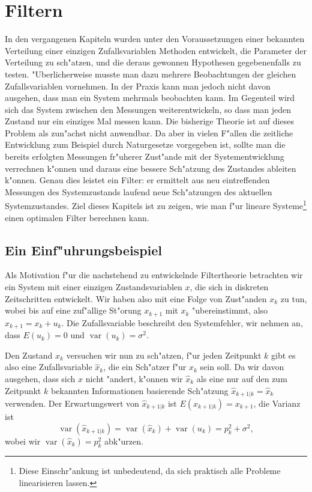 %
%
%
\chapter{Filtern} \label{chapter-filtern}

In den vergangenen Kapiteln wurden unter den Voraussetzungen einer
bekannten Verteilung einer einzigen Zufallsvariablen Methoden entwickelt,
die Parameter der Verteilung zu sch"atzen, und die deraus gewonnen
Hypothesen gegebenenfalls zu testen.
"Uberlicherweise musste man dazu
mehrere Beobachtungen der gleichen Zufallsvariablen vornehmen.
In der Praxis kann man jedoch
nicht davon ausgehen, dass man ein System mehrmals beobachten kann.
Im Gegenteil wird sich das System zwischen den Messungen weiterentwickeln,
so dass man jeden Zustand nur ein einziges Mal messen kann.
Die bisherige
Theorie ist auf dieses Problem als zun"achst nicht anwendbar.
Da aber in vielen F"allen die zeitliche Entwicklung zum Beispiel durch
Naturgesetze vorgegeben ist, sollte man die bereits erfolgten Messungen
fr"uherer Zust"ande mit der Systementwicklung verrechnen k"onnen und
daraus eine bessere Sch"atzung des Zustandes ableiten k"onnen.
Genau
dies leistet ein Filter: er ermittelt aus neu eintreffenden Messungen
des Systemzustands laufend neue Sch"atzungen des aktuellen Systemzustandes.
Ziel dieses Kapitels ist zu zeigen, wie man f"ur lineare Systeme\footnote{Diese
Einschr"ankung ist unbedeutend, da sich praktisch alle Probleme linearisieren lassen.}
einen optimalen Filter berechnen kann.

\section{Ein Einf"uhrungsbeispiel}
Als Motivation f"ur die nachstehend zu entwickelnde Filtertheorie betrachten
wir ein System mit einer einzigen Zustandsvariablen $x$, die sich in diskreten
Zeitschritten entwickelt.
Wir haben also mit eine Folge von Zust"anden $x_k$ zu tun, wobei
bis auf eine zuf"allige St"orung $x_{k+1}$ mit $x_k$ "ubereinstimmt,
also $x_{k+1}=x_k+u_k$.
Die Zufallsvariable beschreibt den Systemfehler, wir
nehmen an, dass $E(u_k)=0$ und $\operatorname{var}(u_k)=\sigma^2$.

Den Zustand $x_k$ versuchen wir nun zu sch"atzen, f"ur jeden Zeitpunkt
$k$ gibt es also eine Zufallsvariable $\hat x_k$, die ein Sch"atzer f"ur
$x_k$ sein soll.
Da wir davon ausgehen, dass sich $x$ nicht "andert, k"onnen wir $\hat x_k$
als eine nur auf den zum Zeitpunkt $k$ bekannten Informationen basierende
Sch"atzung $\hat x_{k+1|k}=\hat x_k$ verwenden.
Der Erwartungswert von $\hat x_{k+1|k}$ ist $E(x_{k+1|k})=x_{k+1}$, die Varianz
ist
\[
\operatorname{var}(\hat x_{k+1|k})
=\operatorname{var}(\hat x_k)+\operatorname{var}(u_k)=p_k^2+\sigma^2,
\]
wobei wir $\operatorname{var}(\hat x_k)=p_k^2$ abk"urzen.

